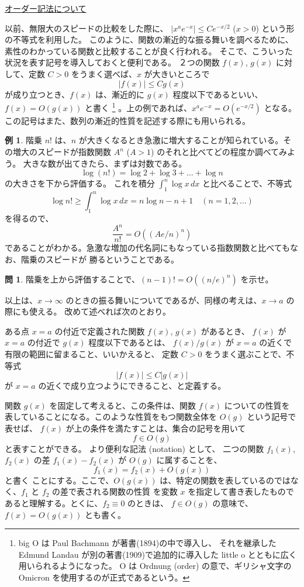 \documentclass[a4paper]{jsarticle}
\theoremstyle{definition}
\newtheorem{Example}[Theorem]{例}
\newtheorem{Exercise}{問}%
\theoremstyle{remark}
\begin{document}
\bigskip
\noindent
\underline{オーダー記法について}

以前、無限大のスピードの比較をした際に、
$|x^ae^{-x}| \leq C e^{-x/2}$ ($x > 0$) という形の不等式を利用した。
このように、関数の漸近的な振る舞いを調べるために、素性のわかっている関数と比較することが良く行われる。
そこで、こういった状況を表す記号を導入しておくと便利である。
２つの関数 $f(x)$, $g(x)$ に対して、定数 $C>0$ をうまく選べば、$x$ が大きいところで
\[
|f(x)| \leq C g(x)
\]
が成り立つとき、$f(x)$ は、漸近的に $g(x)$ 程度以下であるといい、
$f(x) = O(g(x))$ と書く
\footnote{big O は Paul Bachmann が著書(1894)の中で導入し、
それを継承した Edmund Landau が別の著書(1909)で追加的に導入した little o とともに広く用いられるようになった。
O は Ordnung (order) の意で、ギリシャ文字の Omicron を使用するのが正式であるという。}
。上の例であれば、$x^a e^{-x} = O(e^{-x/2})$ となる。
この記号はまた、数列の漸近的性質を記述する際にも用いられる。

\begin{Example}\label{factorial}
階乗 $n!$ は、$n$ が大きくなるとき急激に増大することが知られている。その増大のスピードが指数関数 $A^n$ ($A>1$) 
のそれと比べてどの程度か調べてみよう。
大きな数が出てきたら、まずは対数である。
\[
\log(n!) = \log 2 + \log 3 + \dots + \log n
\]
の大きさを下から評価する。
これを積分 $\int_1^n \log x\, dx$ と比べることで、不等式
\[
\log n! \geq \int_1^n \log x\, dx = n \log n - n + 1
\quad 
(n=1,2,\dots)
\]
を得るので、
\[
\frac{A^n}{n!} = O( (Ae/n)^n) 
\]
であることがわかる。急激な増加の代名詞にもなっている指数関数と比べてもなお、階乗のスピードが
勝るということである。
\end{Example}

\begin{Exercise}
階乗を上から評価することで、$(n-1)! = O((n/e)^n)$ を示せ。
\end{Exercise} 

以上は、$x \to \infty$ のときの振る舞いについてであるが、同様の考えは、$x \to a$ の際にも使える。
改めて述べれば次のとおり。

ある点 $x=a$ の付近で定義された関数 $f(x)$, $g(x)$ があるとき、
$f(x)$ が $x=a$ の付近で $g(x)$ 程度以下であるとは、
$f(x)/g(x)$ が $x=a$ の近くで有限の範囲に留まること、いいかえると、
定数 $C>0$ をうまく選ぶことで、不等式
\[
|f(x)| \leq C|g(x)|
\]
が $x=a$ の近くで成り立つようにできること、と定義する。

関数 $g(x)$ を固定して考えると、この条件は、関数 $f(x)$ についての性質を
表していることになる。このような性質をもつ関数全体を $O(g)$ という記号で表せば、
$f(x)$ が上の条件を満たすことは、集合の記号を用いて
\[
f \in O(g)
\]
と表すことができる。
より便利な記法 (notation) として、
二つの関数 $f_1(x)$, $f_2(x)$ の差 $f_1(x) - f_2(x)$ が $O(g)$ に属することを、
\[
f_1(x) = f_2(x) + O(g(x))
\]
と書く
ことにする。ここで、$O(g(x))$ は、特定の関数を表しているのではなく、$f_1$ と $f_2$ の差で表される関数の性質
を変数 $x$ を指定して書き表したものであると理解する。とくに、$f_2 \equiv 0$ のときは、
$f \in O(g)$ の意味で、$f(x) = O(g(x))$ とも書く。
\end{document}
